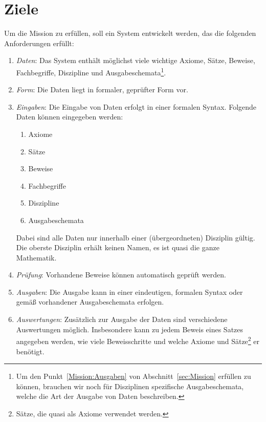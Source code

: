 \documentclass[english,ngerman,parskip=half,headsepline,footsepline]{scrreprt}
\begin{document}
	\section{Ziele}
	\label{sec:Ziele}
	Um die Mission zu erfüllen, soll ein System entwickelt werden, das die folgenden Anforderungen erfüllt:
	
	\begin{enumerate}
		\item \label{Ziel:Daten} \emph{Daten}: Das System enthält möglichst viele wichtige Axiome, Sätze, Beweise, Fachbegriffe, Diszipline und Ausgabeschemata\footnote{ Um den Punkt~\vref{Mission:Ausgaben} von Abschnitt~\vref{sec:Mission} erfüllen zu können, brauchen wir noch für Disziplinen spezifische Ausgabeschemata, welche die Art der Ausgabe von Daten beschreiben.}.
		
		\item \label{Ziel:Form} \emph{Form}: Die Daten liegt in formaler, geprüfter Form vor.
		
		\item \label{Ziel:Eingaben} \emph{Eingaben}: Die Eingabe von Daten erfolgt in einer formalen Syntax. Folgende Daten können eingegeben werden:
		\begin{enumerate}
			\item Axiome
			\item Sätze
			\item Beweise
			\item Fachbegriffe
			\item Diszipline
			\item Ausgabeschemata
		\end{enumerate}
		Dabei sind alle Daten nur innerhalb einer (übergeordneten) Disziplin gültig. Die oberste Disziplin erhält keinen Namen, es ist quasi die ganze Mathematik.
		
		\item \label{Ziel:Prüfung} \emph{Prüfung}: Vorhandene Beweise können automatisch geprüft werden.
		
		\item \label{Ziel:Ausgaben} \emph{Ausgaben}: Die Ausgabe kann in einer eindeutigen, formalen Syntax oder gemäß vorhandener Ausgabeschemata erfolgen.
		
		\item \label{Ziel:Auswertungen} \emph{Auswertungen}: Zusätzlich zur Ausgabe der Daten sind verschiedene Auswertungen möglich. Insbesondere kann zu jedem Beweis eines Satzes angegeben werden, wie viele Beweisschritte und welche Axiome und Sätze\footnote{ Sätze, die quasi als Axiome verwendet werden.} er benötigt.
		

\end{enumerate}
\end{document}
